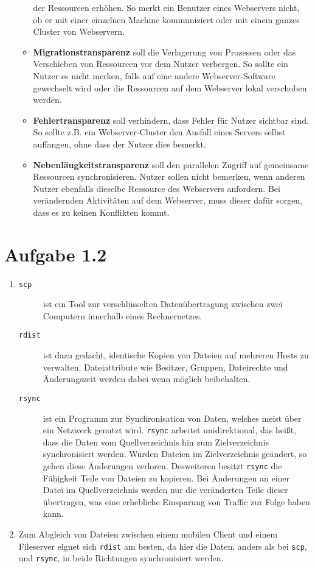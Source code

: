 \documentclass[german,12pt,a4paper]{article}
\begin{document}
\begin{itemize}
\begin{itemize}
		der Ressourcen erhöhen. So merkt ein Benutzer eines Webservers nicht, ob er mit einer einzelnen
		Machine kommuniziert oder mit einem ganzes Cluster von Webservern.
		\item \textbf{Migrationstransparenz} soll die Verlagerung von Prozessen oder das Verschieben von
		Ressourcen vor dem Nutzer verbergen. So sollte ein Nutzer es nicht merken, falls auf eine andere
		Webserver-Software gewechselt wird oder die Ressourcen auf dem Webserver lokal verschoben
		werden.
		\item \textbf{Fehlertransparenz} soll verhindern, dass Fehler für Nutzer sichtbar sind. So sollte
		z.B. ein Webserver-Cluster den Ausfall eines Servers selbst auffangen, ohne dass der Nutzer dies
		bemerkt.
		\item \textbf{Nebenläugkeitstransparenz} soll den parallelen Zugriff auf gemeinsame Ressourcen
		synchronisieren. Nutzer sollen nicht bemerken, wenn anderen Nutzer ebenfalls dieselbe
		Ressource des Webservers anfordern. Bei verändernden Aktivitäten auf dem Webserver, muss dieser
		dafür sorgen, dass es zu keinen Konflikten kommt. 
	\end{itemize}
\end{itemize}


\section*{Aufgabe 1.2}

\begin{enumerate}
	\item 
		\begin{description}
			\item[\texttt{scp}] ist ein Tool zur verschlüsselten Datenübertragung 
				zwischen zwei Computern innerhalb eines Rechnernetzes.
			\item[\texttt{rdist}] ist dazu gedacht, identische Kopien von Dateien 
				auf mehreren Hosts zu verwalten. Dateiattribute wie Besitzer, Gruppen, 
				Dateirechte und Änderungszeit werden dabei wenn möglich beibehalten.
			\item[\texttt{rsync}] ist ein Programm zur Synchronisation von Daten, 
				welches meist über ein Netzwerk genutzt wird. \texttt{rsync} arbeitet
				unidirektional, das heißt, dass die Daten vom 
				Quellverzeichnis hin zum Zielverzeichnis synchronisiert werden. Wurden 
				Dateien im Zielverzeichnis geändert, so gehen diese Änderungen verloren.
				Desweiteren besitzt \texttt{rsync} die Fähigkeit Teile von Dateien 
				zu kopieren. Bei Änderungen an einer Datei im Quellverzeichnis werden 
				nur die veränderten Teile dieser übertragen, was eine erhebliche Einsparung von 
				Traffic zur Folge haben kann.
		\end{description}
	\item Zum Abgleich von Dateien zwischen einem mobilen Client und einem Fileserver 
		eignet sich \texttt{rdist} am besten, da hier die Daten, anders als bei \texttt{scp},
		und \texttt{rsync}, in beide Richtungen synchronisiert werden.
\end{enumerate}
\end{document}
